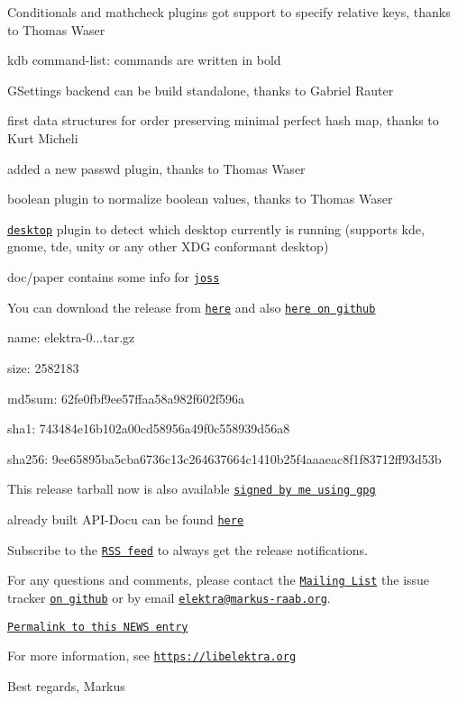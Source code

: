 \begin{DoxyItemize}
\item Conditionals and mathcheck plugins got support to specify relative keys, thanks to Thomas Waser
\item {\ttfamily kdb} command-\/list\+: commands are written in bold
\item G\+Settings backend can be build standalone, thanks to Gabriel Rauter
\item first data structures for order preserving minimal perfect hash map, thanks to Kurt Micheli
\item added a new passwd plugin, thanks to Thomas Waser
\item boolean plugin to normalize boolean values, thanks to Thomas Waser
\item \href{https://master.libelektra.org/src/plugins/desktop}{\tt desktop} plugin to detect which desktop currently is running (supports kde, gnome, tde, unity or any other X\+DG conformant desktop)
\item {\ttfamily doc/paper} contains some info for \href{https://github.com/openjournals/joss}{\tt joss}
\end{DoxyItemize}

You can download the release from \href{https://www.libelektra.org/ftp/elektra/releases/elektra-0.8.18.tar.gz}{\tt here} and also \href{https://github.com/ElektraInitiative/ftp/tree/master/releases/elektra-0.8.18.tar.gz}{\tt here on github}


\begin{DoxyItemize}
\item name\+: elektra-\/0...\+tar.\+gz
\item size\+: 2582183
\item md5sum\+: 62fe0fbf9ee57ffaa58a982f602f596a
\item sha1\+: 743484e16b102a00cd58956a49f0c558939d56a8
\item sha256\+: 9ee65895ba5cba6736c13c264637664c1410b25f4aaaeac8f1f83712ff93d53b
\end{DoxyItemize}

This release tarball now is also available \href{https://www.libelektra.org/ftp/elektra/releases/elektra-0.8.18.tar.gz.gpg}{\tt signed by me using gpg}

already built A\+P\+I-\/\+Docu can be found \href{https://doc.libelektra.org/api/0.8.18/html/}{\tt here}

Subscribe to the \href{https://doc.libelektra.org/news/feed.rss}{\tt R\+SS feed} to always get the release notifications.

For any questions and comments, please contact the \href{https://lists.sourceforge.net/lists/listinfo/registry-list}{\tt Mailing List} the issue tracker \href{https://git.libelektra.org/issues}{\tt on github} or by email \href{mailto:elektra@markus-raab.org}{\tt elektra@markus-\/raab.\+org}.

\href{https://doc.libelektra.org/news/190576e0-9fef-486e-b8da-c4e75be08329.html}{\tt Permalink to this N\+E\+WS entry}

For more information, see \href{https://libelektra.org}{\tt https\+://libelektra.\+org}

Best regards, Markus 